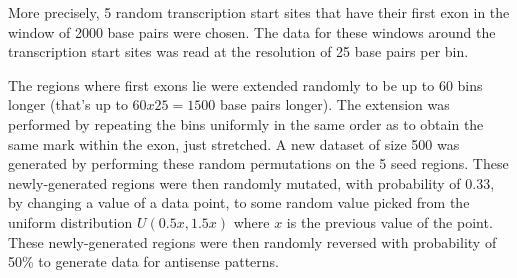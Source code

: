 \documentclass[parskip]{cs4rep}
\begin{document}
More precisely, 5 random transcription start sites that have their first exon in the window of 2000 base pairs were chosen.  The data for these windows around the transcription start sites was read at the resolution of 25 base pairs per bin. 

The regions where first exons lie were extended randomly to be up to 60 bins longer (that's up to $60x25=1500$ base pairs longer). The extension was performed by repeating the bins uniformly in the same order as to obtain the same mark within the exon, just stretched. A new dataset of size 500 was generated by performing these random permutations on the 5 seed regions. 
These newly-generated regions were then randomly mutated, with probability of $0.33$, by changing a value of a data point, to some random value picked from the uniform distribution $U(0.5x, 1.5x)$ where $x$ is the previous value of the point. These newly-generated regions were then randomly reversed with probability of 50\% to generate data for antisense patterns.
\end{document}
